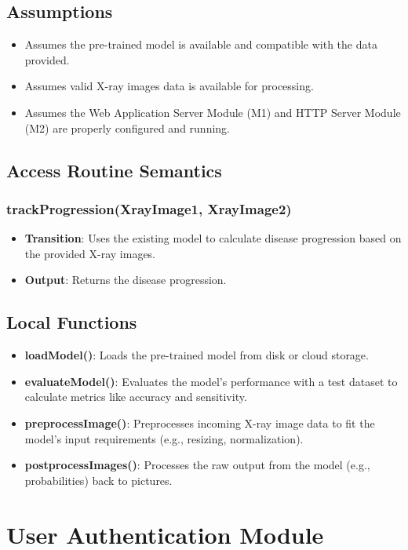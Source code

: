 \documentclass[12pt, titlepage]{article}
\begin{document}
\subsection{Assumptions}
\begin{itemize}
    \item Assumes the pre-trained model is available and compatible with the data provided.
    \item Assumes valid X-ray images data is available for processing.
    \item Assumes the Web Application Server Module (M1) and HTTP Server Module (M2) are properly configured and running.
\end{itemize}

\subsection{Access Routine Semantics}
\subsubsection{trackProgression(XrayImage1, XrayImage2)}
\begin{itemize}
    \item \textbf{Transition}: Uses the existing model to calculate disease progression based on the provided X-ray images.
    \item \textbf{Output}: Returns the disease progression.
\end{itemize}

\subsection{Local Functions}
\begin{itemize}
    \item \textbf{loadModel()}: Loads the pre-trained model from disk or cloud storage.
    \item \textbf{evaluateModel()}: Evaluates the model’s performance with a test dataset to calculate metrics like accuracy and sensitivity.
    \item \textbf{preprocessImage()}: Preprocesses incoming X-ray image data to fit the model's input requirements (e.g., resizing, normalization).
    \item \textbf{postprocessImages()}: Processes the raw output from the model (e.g., probabilities) back to pictures.
\end{itemize}
\newpage
\section{User Authentication Module}
\end{document}
